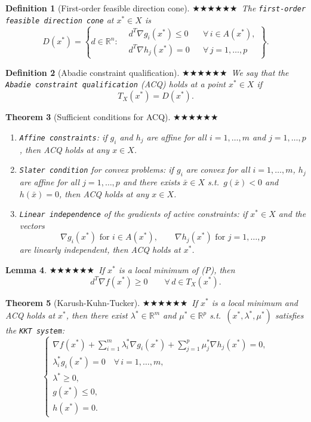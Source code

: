 \documentclass[11pt,a4paper]{article}
\newcommand{\g}{\texttt}
\newcommand{\R}{\mathbb{R}}
\theoremstyle{breakdef}
\newtheorem{definition}{Definition}[section]
\theoremstyle{breakplain}
\newtheorem{theorem}[definition]{Theorem}
\newtheorem{lemma}[definition]{Lemma}
\theoremstyle{remark}
\newcommand{\imp}[1]{\textcolor{impcolor}{%
  \ifcase#1\or$\bigstar$\or$\bigstar\bigstar$\or$\bigstar\bigstar\bigstar$\fi}\ }
\begin{document}
\begin{definition}[First-order feasible direction cone]
    \imp{2}The \g{first-order feasible direction cone} at $x^* \in X$ is
    \[
        D(x^*) = \left\{ d \in \R^n :
        \begin{aligned}
            & d^T\nabla g_i(x^*) \le 0 && \forall\, i \in A(x^*),\\
            & d^T\nabla h_j(x^*) = 0 && \forall\, j = 1, \dots, p
        \end{aligned}
        \right\}.
    \]
\end{definition}

\begin{definition}[Abadie constraint qualification]
    \imp{3}We say that the \g{Abadie constraint qualification} (ACQ) holds at a point $x^* \in X$ if
    \[
        T_X(x^*) = D(x^*).
    \]
\end{definition}

\begin{theorem}[Sufficient conditions for ACQ]
    \imp{3}\leavevmode\begin{enumerate}[label=\alph*)]
        \item \g{Affine constraints}: if $g_i$ and $h_j$ are affine for all $i = 1, \dots, m$ and $j = 1, \dots, p$, then ACQ holds at any $x \in X$.
        \item \g{Slater condition} for convex problems: if $g_i$ are convex for all $i = 1, \dots, m$, $h_j$ are affine for all $j = 1, \dots, p$ and there exists $\bar{x} \in X$ s.t.\ $g(\bar{x}) < 0$ and $h(\bar{x}) = 0$, then ACQ holds at any $x \in X$.
        \item \g{Linear independence} of the gradients of active constraints: if $x^* \in X$ and the vectors
        \[
            \nabla g_i(x^*) \text{ for } i \in A(x^*), \qquad \nabla h_j(x^*) \text{ for } j = 1, \dots, p
        \]
        are linearly independent, then ACQ holds at $x^*$.
    \end{enumerate}
\end{theorem}

\begin{lemma}
    \imp{1}If $x^*$ is a local minimum of (P), then
    \[
        d^T\nabla f(x^*) \ge 0 \qquad \forall\, d \in T_X(x^*).
    \]
\end{lemma}

\begin{theorem}[Karush-Kuhn-Tucker]
    \imp{3}If $x^*$ is a local minimum and ACQ holds at $x^*$, then there exist $\lambda^* \in \R^m$ and $\mu^* \in \R^p$ s.t.\ $(x^*, \lambda^*, \mu^*)$ satisfies the \g{KKT system}:
    \[
        \begin{cases}
            \nabla f(x^*) + \sum_{i=1}^{m} \lambda_i^* \nabla g_i(x^*) + \sum_{j=1}^{p} \mu_j^* \nabla h_j(x^*) = 0,\\
            \lambda_i^* g_i(x^*) = 0 \quad \forall\, i = 1, \dots, m,\\
            \lambda^* \ge 0,\\
            g(x^*) \le 0,\\
            h(x^*) = 0.
        \end{cases}
    \]
\end{theorem}
\end{document}
